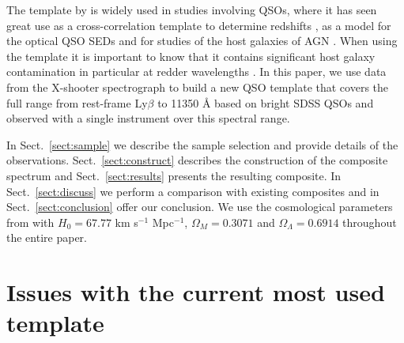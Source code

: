 \documentclass{aa}    %
\newcommand{\sectionname}{Sect.}
\newcommand{\Sect}[1]{\sectionname~\ref{sect:#1}}
\newcommand{\sect}[1]{\Sect{#1}}
\newcommand{\sectlabel}[1]{\label{sect:#1}}
\begin{document}
The template by \citet{VandenBerk2001} is widely used in studies
involving QSOs, where it has seen great use as a cross-correlation
template to determine redshifts \citep{Stoughton2002, Rafiee2011}, as
a model for the optical QSO SEDs \citep{Croom2004, Hopkins2006,
  Hopkins2007} and for studies of the host galaxies of AGN
\citep{Kauffmann2003b}. When using the \citet{VandenBerk2001} template
it is important to know that it contains significant host galaxy
contamination in particular at redder wavelengths \citep[e.g.,][their
  Fig.~5]{Fynbo2013}.  In this paper, we use data from the X-shooter
spectrograph to build a new QSO template that covers the full range
from rest-frame Ly$\beta$ to 11350 {\AA} based on bright SDSS QSOs and
observed with a single instrument over this spectral range. 

In \sect{sample} we describe the sample selection and provide details
of the observations. \sect{construct} describes the construction of
the composite spectrum and \sect{results} presents the resulting
composite. In \sect{discuss} we perform a comparison with existing
composites and in \sect{conclusion} offer our conclusion. We use the
cosmological parameters from \citet{Planck2014} with $H_{0} = 67.77$
km s$^{-1}$ Mpc$^{-1}$, $\Omega_{M} = 0.3071$ and $\Omega_{\Lambda} =
0.6914$ throughout the entire paper.




\section{Issues with the current most used template}   \sectlabel{problem}
\end{document}
